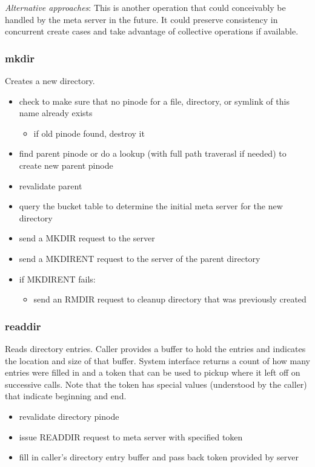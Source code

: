 \documentclass[11pt, letterpaper]{article}
\begin{document}
\emph{Alternative approaches}: This is another operation that could
conceivably be handled by the meta server in the future.  It could 
preserve consistency in concurrent create cases and take advantage of
collective operations if available.

\subsubsection{mkdir}

Creates a new directory.

\begin{itemize}
\item check to make sure that no pinode for a file, directory, or
symlink of this name already exists
\begin{itemize}
\item if old pinode found, destroy it
\end{itemize}
\item find parent pinode or do a lookup (with full path traverasl if needed) 
to create new parent pinode
\item revalidate parent
\item query the bucket table to determine the initial meta server for
the new directory
\item send a MKDIR request to the server
\item send a MKDIRENT request to the server of the parent directory
\item if MKDIRENT fails:
\begin{itemize}
\item send an RMDIR request to cleanup directory that was previously
created
\end{itemize}
\end{itemize}

\subsubsection{readdir}

Reads directory entries.  Caller provides a buffer to hold the entries
and indicates the location and size of that buffer.  System interface
returns a count of how many entries were filled in and a token that can
be used to pickup where it left off on successive calls.  Note that the
token has special values (understood by the caller) that indicate
beginning and end.

\begin{itemize}
\item revalidate directory pinode
\item issue READDIR request to meta server with specified token
\item fill in caller's directory entry buffer and pass back token
provided by server
\end{itemize}
\end{document}
